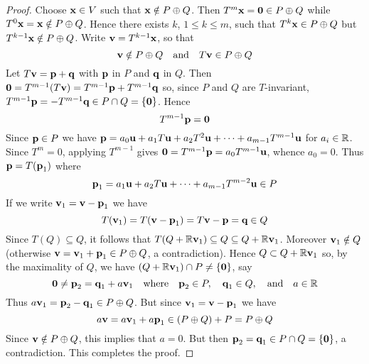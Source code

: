 \begin{proof}
Choose $\textbf{x} \in V$ such that $\textbf{x} \notin P \oplus Q$. Then $T^{m}\textbf{x} = \textbf{0} \in P \oplus Q$ while $T^{0}\textbf{x} = \textbf{x} \notin P \oplus Q$. Hence there exists $k$, $1 \leq k \leq m$, such that $T^{k}\textbf{x} \in P \oplus Q$ but $T^{k-1}\textbf{x} \notin P \oplus Q$. Write $\textbf{v} = T^{k-1}\textbf{x}$, so that
\begin{equation*}
\textbf{v} \notin P \oplus Q \quad \mbox{and} \quad T\textbf{v} \in P \oplus Q
\end{equation*}
Let $T\textbf{v} = \textbf{p} + \textbf{q}$ with $\textbf{p}$ in $P$ and $\textbf{q}$ in $Q$. Then $\textbf{0} = T^{m-1}(T\textbf{v}) = T^{m-1}\textbf{p} + T^{m-1}\textbf{q}$ so, since $P$ and $Q$ are $T$-invariant, $T^{m-1}\textbf{p} = -T^{m-1}\textbf{q} \in P \cap Q = \{\textbf{0}\}$. Hence
\begin{equation*}
T^{m-1}\textbf{p} = \textbf{0}
\end{equation*}
Since $\textbf{p} \in P$ we have $\textbf{p} = a_{0}\textbf{u} + a_{1}T\textbf{u} + a_{2}T^{2}\textbf{u} + \cdots + a_{m-1}T^{m-1}\textbf{u}$ for $a_{i} \in \mathbb{R}$. Since $T^{m} = 0$, applying $T^{m-1}$ gives $\textbf{0} = T^{m-1}\textbf{p} = a_{0}T^{m-1}\textbf{u}$, whence $a_{0} = 0$. Thus $\textbf{p} = T(\textbf{p}_{1})$ where 
\begin{equation*}
\textbf{p}_{1} = a_{1}\textbf{u} + a_{2}T\textbf{u} + \cdots  + a_{m-1}T^{m-2}\textbf{u} \in P
\end{equation*}
If we write $\textbf{v}_{1} = \textbf{v} - \textbf{p}_{1}$ we have
\begin{equation*}
T(\textbf{v}_1) = T(\textbf{v} - \textbf{p}_1) = T\textbf{v} - \textbf{p} = \textbf{q} \in Q
\end{equation*}
Since $T(Q) \subseteq Q$, it follows that $T(Q + \mathbb{R}\textbf{v}_{1}) \subseteq Q \subseteq Q + \mathbb{R}\textbf{v}_{1}$. Moreover $\textbf{v}_{1} \notin Q$ (otherwise $\textbf{v} = \textbf{v}_{1} + \textbf{p}_{1} \in P \oplus Q$, a contradiction). Hence $Q \subset Q + \mathbb{R}\textbf{v}_{1}$ so, by the maximality of $Q$, we have $(Q + \mathbb{R}\textbf{v}_{1}) \cap P \neq \{\textbf{0}\}$, say
\begin{equation*}
\textbf{0} \neq \textbf{p}_2 = \textbf{q}_1 + a\textbf{v}_1 \quad \mbox{where} \quad \textbf{p}_2 \in P, \quad \textbf{q}_1 \in Q, \quad \mbox{and} \quad a \in \mathbb{R}
\end{equation*}
Thus $a\textbf{v}_{1} = \textbf{p}_{2} - \textbf{q}_{1} \in P \oplus Q$. But since $\textbf{v}_{1} = \textbf{v} - \textbf{p}_{1}$ we have
\begin{equation*}
a\textbf{v} = a\textbf{v}_1 + a\textbf{p}_1 \in (P \oplus Q) + P = P \oplus Q
\end{equation*}
Since $\textbf{v} \notin P \oplus Q$, this implies that $a = 0$. But then $\textbf{p}_{2} = \textbf{q}_{1} \in P \cap Q = \{\textbf{0}\}$, a contradiction. This completes the proof.
\end{proof}

